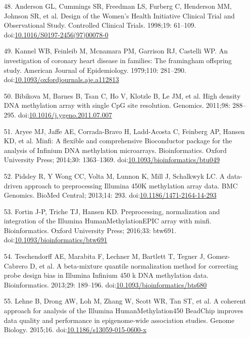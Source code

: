 \documentclass[]{article}
\theoremstyle{definition}
\theoremstyle{definition}
\theoremstyle{definition}
\theoremstyle{remark}
\begin{document}
48. Anderson GL, Cummings SR, Freedman LS, Furberg C, Henderson MM,
Johnson SR, et al. Design of the Women's Health Initiative Clinical
Trial and Observational Study. Controlled Clinical Trials. 1998;19:
61--109.
doi:\href{http://dx.doi.org/10.1016/S0197-2456(97)00078-0}{10.1016/S0197-2456(97)00078-0}

49. Kannel WB, Feinleib M, Mcnamara PM, Garrison RJ, Castelli WP. An
investigation of coronary heart disease in families: The framingham
offspring study. American Journal of Epidemiology. 1979;110: 281--290.
doi:\href{http://dx.doi.org/10.1093/oxfordjournals.aje.a112813}{10.1093/oxfordjournals.aje.a112813}

50. Bibikova M, Barnes B, Tsan C, Ho V, Klotzle B, Le JM, et al. High
density DNA methylation array with single CpG site resolution. Genomics.
2011;98: 288--295.
doi:\href{http://dx.doi.org/10.1016/j.ygeno.2011.07.007}{10.1016/j.ygeno.2011.07.007}

51. Aryee MJ, Jaffe AE, Corrada-Bravo H, Ladd-Acosta C, Feinberg AP,
Hansen KD, et al. Minfi: A flexible and comprehensive Bioconductor
package for the analysis of Infinium DNA methylation microarrays.
Bioinformatics. Oxford University Press; 2014;30: 1363--1369.
doi:\href{http://dx.doi.org/10.1093/bioinformatics/btu049}{10.1093/bioinformatics/btu049}

52. Pidsley R, {Y Wong} CC, Volta M, Lunnon K, Mill J, Schalkwyk LC. A
data-driven approach to preprocessing Illumina 450K methylation array
data. BMC Genomics. BioMed Central; 2013;14: 293.
doi:\href{http://dx.doi.org/10.1186/1471-2164-14-293}{10.1186/1471-2164-14-293}

53. Fortin J-P, Triche TJ, Hansen KD. Preprocessing, normalization and
integration of the Illumina HumanMethylationEPIC array with minfi.
Bioinformatics. Oxford University Press; 2016;33: btw691.
doi:\href{http://dx.doi.org/10.1093/bioinformatics/btw691}{10.1093/bioinformatics/btw691}

54. Teschendorff AE, Marabita F, Lechner M, Bartlett T, Tegner J,
Gomez-Cabrero D, et al. A beta-mixture quantile normalization method for
correcting probe design bias in Illumina Infinium 450 k DNA methylation
data. Bioinformatics. 2013;29: 189--196.
doi:\href{http://dx.doi.org/10.1093/bioinformatics/bts680}{10.1093/bioinformatics/bts680}

55. Lehne B, Drong AW, Loh M, Zhang W, Scott WR, Tan ST, et al. A
coherent approach for analysis of the Illumina HumanMethylation450
BeadChip improves data quality and performance in epigenome-wide
association studies. Genome Biology. 2015;16.
doi:\href{http://dx.doi.org/10.1186/s13059-015-0600-x}{10.1186/s13059-015-0600-x}
\end{document}
